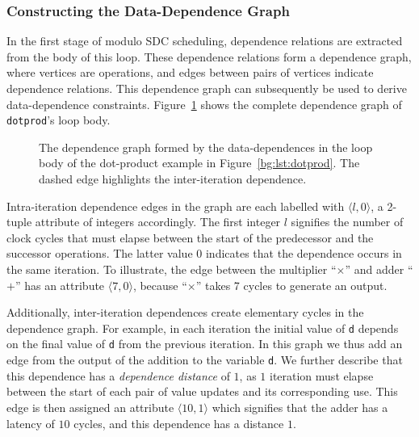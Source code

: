 \subsubsection{Constructing the Data-Dependence Graph}

In the first stage of modulo SDC scheduling, dependence relations are extracted
from the body of this loop.  These dependence relations form a dependence
graph, where vertices are operations, and edges between pairs of vertices
indicate dependence relations.  This dependence graph can subsequently be used
to derive data-dependence constraints.  Figure~\ref{bg:fig:depgraph} shows the
complete dependence graph of \verb|dotprod|'s loop body.
\begin{figure}[ht]
    \centering
    \caption{%
        The dependence graph formed by the data-dependences in the loop body
        of the dot-product example in Figure~\ref{bg:lst:dotprod}.  The dashed
        edge highlights the inter-iteration dependence.
    }\label{bg:fig:depgraph}
\end{figure}

Intra-iteration dependence edges in the graph are each labelled with $\langle
l, 0 \rangle$, a 2-tuple attribute of integers accordingly.  The first integer
$l$ signifies the number of clock cycles that must elapse between the start of
the predecessor and the successor operations.  The latter value $0$ indicates
that the dependence occurs in the same iteration.  To illustrate, the edge
between the multiplier ``$\times$'' and adder ``$+$'' has an attribute $\langle
7, 0 \rangle$, because ``$\times$'' takes 7 cycles to generate an output.

Additionally, inter-iteration dependences create elementary cycles in the
dependence graph.  For example, in each iteration the initial value of \verb|d|
depends on the final value of \verb|d| from the previous iteration.  In this
graph we thus add an edge from the output of the addition to the variable
\verb|d|.  We further describe that this dependence has a \emph{dependence
distance} of $1$, as $1$ iteration must elapse between the start of each pair
of value updates and its corresponding use.  This edge is then assigned
an attribute $\langle 10, 1 \rangle$ which signifies that the adder has a
latency of $10$ cycles, and this dependence has a distance $1$.


